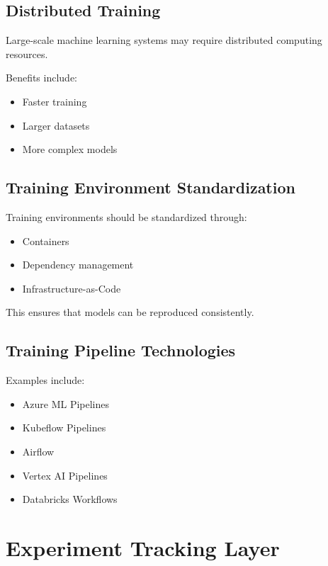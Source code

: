 \subsection{Distributed Training}

Large-scale machine learning systems may require distributed computing resources.

Benefits include:

\begin{itemize}
    \item Faster training
    \item Larger datasets
    \item More complex models
\end{itemize}

\subsection{Training Environment Standardization}

Training environments should be standardized through:

\begin{itemize}
    \item Containers
    \item Dependency management
    \item Infrastructure-as-Code
\end{itemize}

This ensures that models can be reproduced consistently.

\subsection{Training Pipeline Technologies}

Examples include:

\begin{itemize}
    \item Azure ML Pipelines
    \item Kubeflow Pipelines
    \item Airflow
    \item Vertex AI Pipelines
    \item Databricks Workflows
\end{itemize}

\section{Experiment Tracking Layer}

